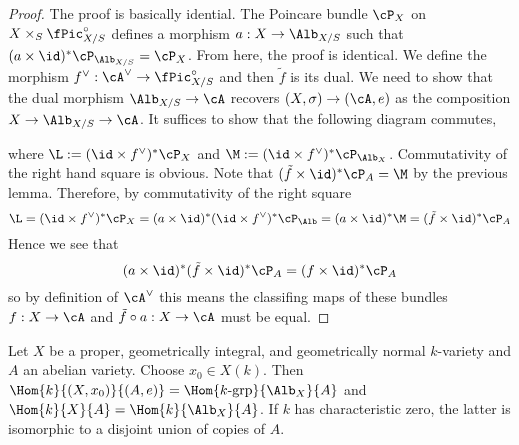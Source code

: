 \documentclass[12pt]{article}
\begin{document}
\begin{proof}
The proof is basically idential. The Poincare bundle $\cP_X$ on $X \times_S \fPic^\circ_{X/S}$ defines a morphism $a : X \to \Alb_{X/S}$ such that $(a \times \id)^* \cP_{\Alb_{X/S}} = \cP_X$. From here, the proof is identical. We define the morphism $f^\vee : \cA^\vee \to \fPic_{X/S}^\circ$ and then $\tilde{f}$ is its dual. We need to show that the dual morphism $\Alb_{X/S} \to \cA$ recovers $(X, \sigma) \to (\cA, e)$ as the composition $X \to \Alb_{X/S} \to \cA$. It suffices to show that the following diagram commutes,
\begin{center}
\end{center}  
where $\L := (\id \times f^\vee)^* \cP_X$ and $\M := (\id \times f^\vee)^* \cP_{\Alb_X}$. Commutativity of the right hand square is obvious. Note that $(\tilde{f} \times \id)^* \cP_A = \M$ by the previous lemma. Therefore, by commutativity of the right square
\[ \L = (\id \times f^\vee)^* \cP_X = (a \times \id)^* (\id \times f^\vee)^* \cP_{\Alb} = (a \times \id)^* \M = (\tilde{f} \times \id)^* \cP_A \]
Hence we see that
\[ (a \times \id)^* (\tilde{f} \times \id)^* \cP_A = (f \times \id)^* \cP_A \]
so by definition of $\cA^\vee$ this means the classifing maps of these bundles $f : X \to \cA$ and $\tilde{f} \circ a : X \to \cA$ must be equal. 
\end{proof}

\begin{cor}
Let $X$ be a proper, geometrically integral, and geometrically normal $k$-variety and $A$ an abelian variety. Choose $x_0 \in X(k)$. Then $\Hom{k}{(X, x_0)}{(A, e)} = \Hom{k\text{-grp}}{\Alb_X}{A}$ and $\Hom{k}{X}{A} = \Hom{k}{\Alb_X}{A}$. If $k$ has characteristic zero, the latter is isomorphic to a disjoint union of copies of $A$. 
\end{cor}
\end{document}
